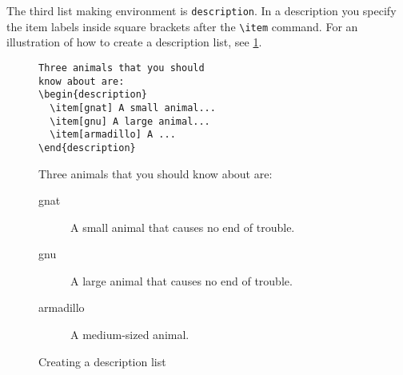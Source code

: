 The third list making environment is {\tt description}.
In a description you specify the item labels inside square brackets
after the \verb|\item| command.
For an illustration of how to create a description list,
see \ref{fig:description}.
\begin{figure}
\footnotesize
\begin{minipage}[t]{0.48\textwidth}
\begin{verbatim}
Three animals that you should
know about are:
\begin{description}
  \item[gnat] A small animal...
  \item[gnu] A large animal...
  \item[armadillo] A ...
\end{description}
\end{verbatim}
\end{minipage}\hfill
\begin{minipage}[t]{0.48\textwidth}
Three animals that you should
know about are:
\begin{description}
  \item[gnat] A small animal that causes no end of trouble.
  \item[gnu] A large animal that causes no end of trouble.
  \item[armadillo] A medium-sized animal.
\end{description}
\end{minipage}
\vspace{1em}
\caption{Creating a description list}
\label{fig:description}
\end{figure}
 
